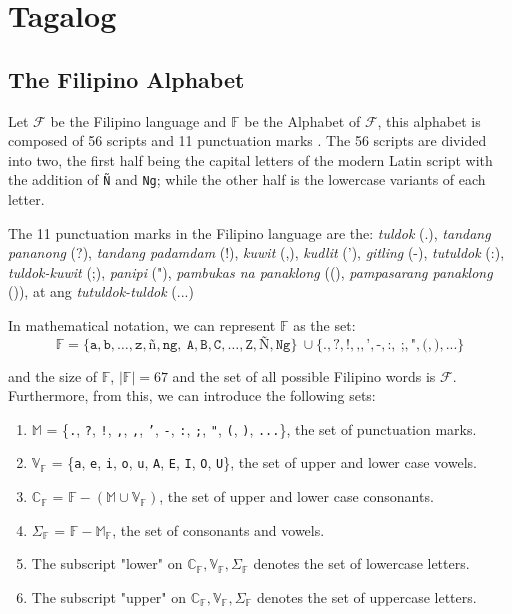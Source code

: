 \section{Tagalog}
\subsection{The Filipino Alphabet}
Let \(\mathcal{F}\) be the Filipino language and \(\mathbb{F}\) be the Alphabet of \(\mathcal{F}\), this alphabet is
composed of 56 scripts and 11 punctuation marks \cite{OOP}. The 56 scripts are divided into
two, the first half being the capital letters of the modern Latin script with
the addition of \texttt{Ñ} and \texttt{Ng}; while the other half is the lowercase variants
of each letter.

The 11 punctuation marks in the Filipino language are the: \textit{tuldok} (.),
\textit{tandang pananong} (?), \textit{tandang padamdam} (!), \textit{kuwit} (,),
\textit{kudlit} ('), \textit{\textit{gitling}} (-), \textit{tutuldok} (:),
\textit{tuldok-kuwit} (;), \textit{panipi} ("), \textit{pambukas na panaklong}
((), \textit{pampasarang panaklong} ()), at ang \textit{tutuldok-tuldok} (...)

In mathematical notation, we can represent \(\mathbb{F}\) as the set:
\[
    \mathbb{F} = \{\texttt{a},\texttt{b},\dots,\texttt{z},\texttt{ñ},\texttt{ng},   \
    \texttt{A},\texttt{B},\texttt{C},\dots,\texttt{Z},\texttt{Ñ},\texttt{Ng}\}         \
    \cup \{\texttt{.},\texttt{?},\texttt{!},\texttt{,},\texttt{'},\texttt{-},\texttt{:}, \
    \texttt{;},\texttt{"},\texttt{(},\texttt{)}, \texttt{...}\}
\]

and the size of \(\mathbb{F}\), \(|\mathbb{F}| = 67\) and the set of all possible Filipino words is $\mathcal{F}$. Furthermore, from this, we can introduce the following sets:
\begin{enumerate}
    \item \(\mathbb{M}\) = \{\texttt{.}, \texttt{?}, \texttt{!}, \texttt{,}, \texttt{,}, \texttt{'}, \texttt{-}, \texttt{:}, \texttt{;}, \texttt{"}, \texttt{(}, \texttt{)}, \texttt{...}\}, the set of punctuation marks.
    \item \(\mathbb{V}_\mathbb{F}\) = \{\texttt{a}, \texttt{e}, \texttt{i}, \texttt{o}, \texttt{u}, \texttt{A}, \texttt{E}, \texttt{I}, \texttt{O}, \texttt{U}\}, the set of upper and lower case vowels.
    \item \(\mathbb{C}_\mathbb{F}\) = \(\mathbb{F} - (\mathbb{M} \cup \mathbb{V}_\mathbb{F})\),
          the set of upper and lower case consonants.
    \item \(\Sigma_\mathbb{F}\) = \(\mathbb{F} - \mathbb{M}_\mathbb{F}\), the set of consonants and vowels.
    \item The subscript "lower" on \(\mathbb{C}_\mathbb{F}, \mathbb{V}_\mathbb{F}, \Sigma_\mathbb{F}\) denotes the set of lowercase letters.
    \item The subscript "upper" on \(\mathbb{C}_\mathbb{F}, \mathbb{V}_\mathbb{F}, \Sigma_\mathbb{F}\) denotes the set of uppercase letters.
\end{enumerate}

